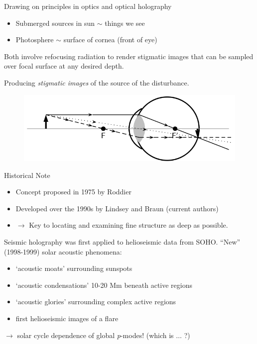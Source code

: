 \documentclass{beamer}
\begin{document}
\begin{frame}{Drawing on principles in optics and optical holography}
    \begin{itemize}
        \item Submerged sources in sun $\sim$ things we see
        \item Photosphere $\sim$ surface of cornea (front of eye)
    \end{itemize} 
    Both involve refocusing radiation to render stigmatic images
    that can be sampled over focal surface at any desired depth.

    Producing \emph{stigmatic images} of the source of the disturbance.
    \begin{figure}
    \includegraphics[width=\paperwidth]{eye.png}
    \end{figure}
\end{frame}

\begin{frame}{Historical Note}
    \begin{itemize}
        \item Concept proposed in 1975 by Roddier
        \item Developed over the 1990s by Lindsey and Braun
            (current authors)
        \item $\rightarrow$ Key to locating and examining
        fine structure as deep as possible.
    \end{itemize}
    Seismic holography was first applied to helioseismic data from SOHO\@.
    ``New'' (1998-1999) solar acoustic phenomena:
    \begin{itemize}
        \item `acoustic moats' surrounding sunspots
        \item `acoustic condensations' 10-20 Mm beneath active regions
        \item `acoustic glories' surrounding complex active regions
        \item first helioseismic images of a flare
    \end{itemize}
    $\rightarrow$ solar cycle dependence of global \emph{p}-modes!
    (which is $\ldots$ ?)
\end{frame}
\end{document}
